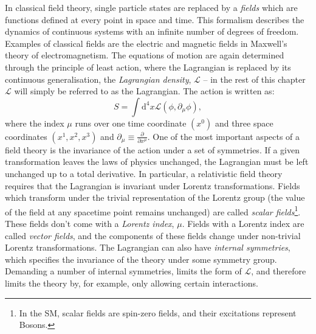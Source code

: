 In classical field theory, single particle states are replaced by a \textit{fields} which are functions defined at every point in space and time. This formalism describes the dynamics of continuous systems with an infinite number of degrees of freedom. Examples of classical fields are the electric and magnetic fields in Maxwell's theory of electromagnetism. The equations of motion are again determined through the principle of least action, where the Lagrangian is replaced by its continuous generalisation, the \textit{Lagrangian density}, $\mathcal{L}$ -- in the rest of this chapter $\mathcal{L}$ will simply be referred to as the Lagrangian. The action is written as:
\begin{equation}
    S=\int\mathrm{d}^4x \mathcal{L}(\phi,\partial_\mu\phi),
\end{equation}
where the index $\mu$ runs over one time coordinate $(x^0)$ and three space coordinates $(x^1,x^2,x^3)$ and $\partial_\mu\equiv\frac{\partial}{\partial x^\mu}$. One of the most important aspects of a field theory is the invariance of the action under a set of symmetries. If a given transformation leaves the laws of physics unchanged, the Lagrangian must be left unchanged up to a total derivative. In particular, a relativistic field theory requires that the Lagrangian is invariant under Lorentz transformations. Fields which transform under the trivial representation of the Lorentz group (the value of the field at any spacetime point remains unchanged) are called \textit{scalar fields}\footnote{In the SM, scalar fields are spin-zero fields, and their excitations represent Bosons.}. These fields don't come with a \textit{Lorentz index}, $\mu$. Fields with a Lorentz index are called \textit{vector fields}, and the components of these fields change under non-trivial Lorentz transformations. The Lagrangian can also have \textit{internal symmetries}, which specifies the invariance of the theory under some symmetry group. Demanding a number of internal symmetries, limits the form of $\mathcal{L}$, and therefore limits the theory by, for example, only allowing certain interactions.

